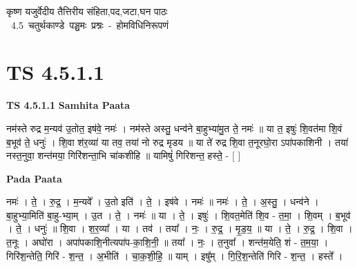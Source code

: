 \documentclass[17pt]{extarticle}
\begin{document}
\begin{titlepage}
    \begin{center}
 
\begin{sanskrit}
    { \Huge
    कृष्ण यजुर्वेदीय तैत्तिरीय संहिता,पद,जटा,घन पाठः 
    }
    \\
    \vspace{2.5cm}
    \mbox{ \Huge
    4.5      चतुर्थकाण्डे पञ्चमः प्रश्नः - होमविधिनिरूपणं   }
\end{sanskrit}
\end{center}

\end{titlepage}
\tableofcontents
\pagebreak

\section*{ TS 4.5.1.1 }

\textbf{TS 4.5.1.1 } \newline
\textbf{Samhita Paata} \newline

नम॑स्ते रुद्र म॒न्यव॑ उ॒तोत॒ इष॑वे॒ नमः॑ । नम॑स्ते अस्तु॒ धन्व॑ने बा॒हुभ्या॑मु॒त ते॒ नमः॑ ॥                                   या त॒ इषुः॑ शि॒वत॑मा शि॒वं ब॒भूव॑ ते॒ धनुः॑ । शि॒वा श॑र॒व्या॑ या तव॒ तया॑ नो रुद्र मृडय ॥     या ते॑ रुद्र शि॒वा त॒नूरघो॒रा ऽपा॑पकाशिनी । तया॑ नस्त॒नुवा॒ शन्त॑मया॒ गिरि॑शन्ता॒भि चा॑कशीहि ॥                                यामिषुं॑ गिरिशन्त॒ हस्ते॒ - [  ] \newline

\textbf{Pada Paata} \newline

नमः॑ । ते॒ । रु॒द्र॒ । म॒न्यवे᳚ । उ॒तो इति॑ । ते॒ । इष॑वे । नमः॑ ॥ नमः॑ । ते॒ । अ॒स्तु॒ । धन्व॑ने । बा॒हुभ्या॒मिति॑ बा॒हु-भ्या॒म् । उ॒त । ते॒ । नमः॑ ॥ या । ते॒ । इषुः॑ । शि॒वत॒मेति॑ शि॒व - त॒मा॒ । शि॒वम् । ब॒भूव॑ । ते॒ । धनुः॑ ॥ शि॒वा । श॒र॒व्या᳚ । या । तव॑ । तया᳚ । नः॒ । रु॒द्र॒ । मृ॒ड॒य॒ ॥ या । ते॒ । रु॒द्र॒ । शि॒वा । त॒नूः । अघो॑रा । अपा॑पकाशि॒नीत्यपा॑प-का॒शि॒नी॒ ॥ तया᳚ । नः॒ । त॒नुवा᳚ । शन्त॑म॒येति॒ शं - त॒म॒या॒ । गिरि॑श॒न्तेति॒ गिरि॑ - श॒न्त॒ । अ॒भीति॑ । चा॒क॒शी॒हि॒ ॥ याम् । इषु᳚म् । गि॒रि॒श॒न्तेति॑ गिरि - श॒न्त॒ । हस्ते᳚ ।  \newline




\end{document}
